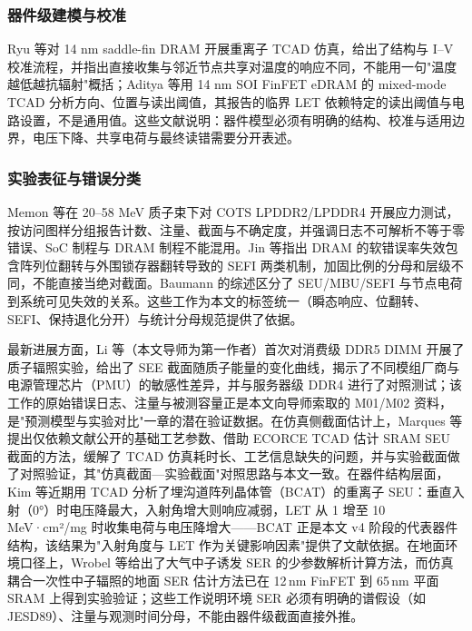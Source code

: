 \subsubsection{器件级建模与校准}
Ryu 等对 14 nm saddle-fin DRAM 开展重离子 TCAD 仿真，给出了结构与 I--V 校准流程，并指出直接收集与邻近节点共享对温度的响应不同，不能用一句"温度越低越抗辐射"概括\cite{ryu2025}；Aditya 等用 14 nm SOI FinFET eDRAM 的 mixed-mode TCAD 分析方向、位置与读出阈值，其报告的临界 LET 依赖特定的读出阈值与电路设置，不是通用值\cite{aditya2018}。这些文献说明：器件模型必须有明确的结构、校准与适用边界，电压下降、共享电荷与最终读错需要分开表述。

\subsubsection{实验表征与错误分类}
Memon 等在 20--58 MeV 质子束下对 COTS LPDDR2/LPDDR4 开展应力测试，按访问图样分组报告计数、注量、截面与不确定度，并强调日志不可解析不等于零错误、SoC 制程与 DRAM 制程不能混用\cite{memon2025}。Jin 等指出 DRAM 的软错误率失效包含阵列位翻转与外围锁存器翻转导致的 SEFI 两类机制，加固比例的分母和层级不同，不能直接当绝对截面\cite{jin2026}。Baumann 的综述区分了 SEU/MBU/SEFI 与节点电荷到系统可见失效的关系\cite{baumann2005}。这些工作为本文的标签统一（瞬态响应、位翻转、SEFI、保持退化分开）与统计分母规范提供了依据。

最新进展方面，Li 等（本文导师为第一作者）首次对消费级 DDR5 DIMM 开展了质子辐照实验，给出了 SEE 截面随质子能量的变化曲线，揭示了不同模组厂商与电源管理芯片（PMU）的敏感性差异，并与服务器级 DDR4 进行了对照测试\cite{li2025ddr5}；该工作的原始错误日志、注量与被测容量正是本文向导师索取的 M01/M02 资料，是"预测模型与实验对比"一章的潜在验证数据。在仿真侧截面估计上，Marques 等提出仅依赖文献公开的基础工艺参数、借助 ECORCE TCAD 估计 SRAM SEU 截面的方法，缓解了 TCAD 仿真耗时长、工艺信息缺失的问题，并与实验截面做了对照验证\cite{marques2025}，其"仿真截面—实验截面"对照思路与本文一致。在器件结构层面，Kim 等近期用 TCAD 分析了埋沟道阵列晶体管（BCAT）的重离子 SEU：垂直入射（0°）时电压降最大，入射角增大则响应减弱，LET 从 1 增至 10\,MeV·cm²/mg 时收集电荷与电压降增大\cite{kim2025bcat}——BCAT 正是本文 v4 阶段的代表器件结构，该结果为"入射角度与 LET 作为关键影响因素"提供了文献依据。在地面环境口径上，Wrobel 等给出了大气中子诱发 SER 的少参数解析计算方法\cite{wrobel2023}，而仿真耦合一次性中子辐照的地面 SER 估计方法已在 12\,nm FinFET 到 65\,nm 平面 SRAM 上得到实验验证；这些工作说明环境 SER 必须有明确的谱假设（如 JESD89）、注量与观测时间分母，不能由器件级截面直接外推。

